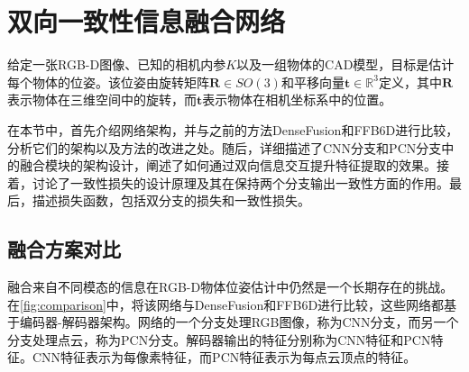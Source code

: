 \section{双向一致性信息融合网络}

给定一张RGB-D图像、已知的相机内参$K$以及一组物体的CAD模型，目标是估计每个物体的位姿。该位姿由旋转矩阵$\bm{R} \in SO(3)$和平移向量$\bm{t} \in \mathbb{R}^3$定义，其中$\bm{R}$表示物体在三维空间中的旋转，而$\bm{t}$表示物体在相机坐标系中的位置。

在本节中，首先介绍网络架构，并与之前的方法DenseFusion\cite{wang2019densefusion}和FFB6D\cite{he2021ffb6d}进行比较，分析它们的架构以及方法的改进之处。随后，详细描述了CNN分支和PCN分支中的融合模块的架构设计，阐述了如何通过双向信息交互提升特征提取的效果。接着，讨论了一致性损失的设计原理及其在保持两个分支输出一致性方面的作用。最后，描述损失函数，包括双分支的损失和一致性损失。

\subsection{融合方案对比}

融合来自不同模态的信息在RGB-D物体位姿估计中仍然是一个长期存在的挑战。在\autoref{fig:comparison}中，将该网络与DenseFusion\cite{wang2019densefusion}和FFB6D\cite{he2021ffb6d}进行比较，这些网络都基于编码器-解码器架构。网络的一个分支处理RGB图像，称为CNN分支，而另一个分支处理点云，称为PCN分支。解码器输出的特征分别称为CNN特征和PCN特征。CNN特征表示为每像素特征，而PCN特征表示为每点云顶点的特征。

